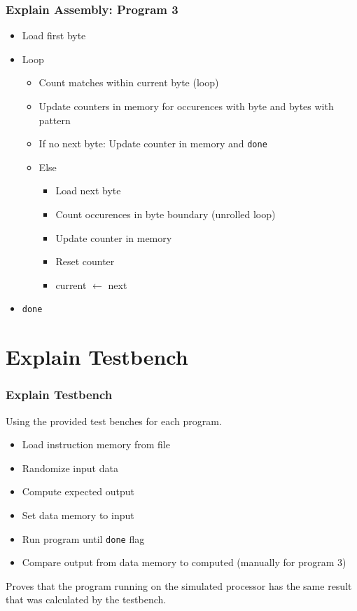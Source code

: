 	\begin{frame}
		\frametitle{Explain Assembly: Program 3}
		\begin{itemize}
			\item Load first byte
			\item Loop
				\begin{itemize}
					\item Count matches within current byte (loop)
					\item Update counters in memory for occurences with byte and bytes with pattern
					\item If no next byte: Update counter in memory and \texttt{done}
					\item Else
						\begin{itemize}
							\item Load next byte
							\item Count occurences in byte boundary (unrolled loop)
							\item Update counter in memory
							\item Reset counter
							\item current $\leftarrow$ next
						\end{itemize}
				\end{itemize}
			\item \texttt{done}
		\end{itemize}
	\end{frame}

	\section{Explain Testbench}

	\begin{frame}
		\frametitle{Explain Testbench}

		Using the provided test benches for each program.

		\begin{itemize}
			\item Load instruction memory from file
			\item Randomize input data
			\item Compute expected output
			\item Set data memory to input
			\item Run program until \texttt{done} flag
			\item Compare output from data memory to computed (manually for program 3)
		\end{itemize}

		Proves that the program running on the simulated processor has the same result that was calculated by the testbench.
	\end{frame}

